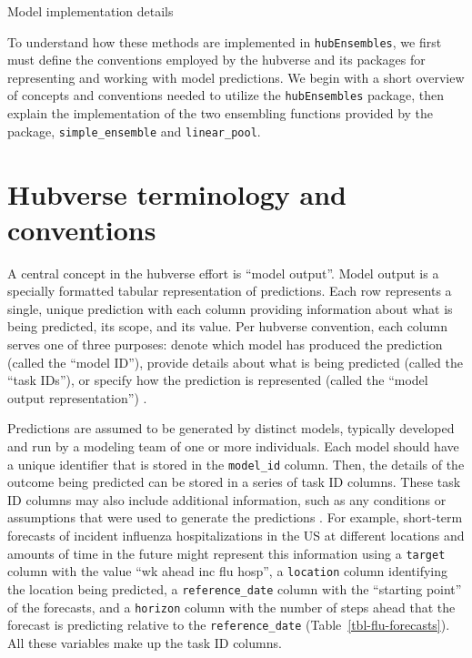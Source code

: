 \documentclass[
  article,
  shortnames,
  notitle]{jss}
\begin{document}
Model implementation details

To understand how these methods are implemented in
\texttt{hubEnsembles}, we first must define the conventions employed by
the hubverse and its packages for representing and working with model
predictions. We begin with a short overview of concepts and conventions
needed to utilize the \texttt{hubEnsembles} package, then explain the
implementation of the two ensembling functions provided by the package,
\texttt{simple\_ensemble} and \texttt{linear\_pool}.

\section{Hubverse terminology and
conventions}\label{hubverse-terminology-and-conventions}

A central concept in the hubverse effort is ``model output''. Model
output is a specially formatted tabular representation of predictions.
Each row represents a single, unique prediction with each column
providing information about what is being predicted, its scope, and its
value. Per hubverse convention, each column serves one of three
purposes: denote which model has produced the prediction (called the
``model ID''), provide details about what is being predicted (called the
``task IDs''), or specify how the prediction is represented (called the
``model output representation'') \citep{hubverse_docs}.

Predictions are assumed to be generated by distinct models, typically
developed and run by a modeling team of one or more individuals. Each
model should have a unique identifier that is stored in the
\texttt{model\_id} column. Then, the details of the outcome being
predicted can be stored in a series of task ID columns. These task ID
columns may also include additional information, such as any conditions
or assumptions that were used to generate the predictions
\citep{hubverse_docs}. For example, short-term forecasts of incident
influenza hospitalizations in the US at different locations and amounts
of time in the future might represent this information using a
\texttt{target} column with the value ``wk ahead inc flu hosp'', a
\texttt{location} column identifying the location being predicted, a
\texttt{reference\_date} column with the ``starting point'' of the
forecasts, and a \texttt{horizon} column with the number of steps ahead
that the forecast is predicting relative to the \texttt{reference\_date}
(Table~\ref{tbl-flu-forecasts}). All these variables make up the task ID
columns.
\end{document}
